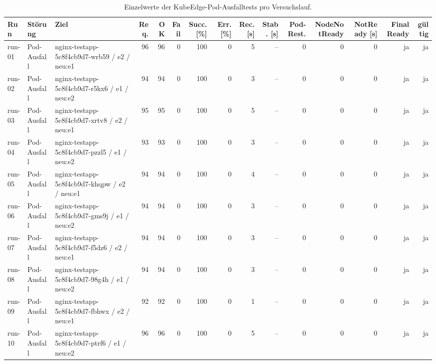 \begin{table}
\centering
\scriptsize
\setlength{\tabcolsep}{3pt}
\renewcommand{\arraystretch}{1.08}
\begin{tabular}{l l p{3.2cm} r r r r r r r r r r r r}
\toprule
Run & Störung & Ziel & Req. & OK & Fail & Succ. [\%] & Err. [\%] & Rec. [s] & Stab. [s] & Pod-Rest. & NodeNotReady & NotReady [s] & Final Ready & gültig \\
\midrule
run-01 & Pod-Ausfall & nginx-testapp-5c8f4cb9d7-wrb59 / e2 / neu:e1 & 96 & 96 & 0 & 100 & 0 & 5 & -- & 0 & 0 & 0 & ja & ja \\
run-02 & Pod-Ausfall & nginx-testapp-5c8f4cb9d7-r5kx6 / e1 / neu:e2 & 94 & 94 & 0 & 100 & 0 & 3 & -- & 0 & 0 & 0 & ja & ja \\
run-03 & Pod-Ausfall & nginx-testapp-5c8f4cb9d7-xrtv8 / e2 / neu:e1 & 95 & 95 & 0 & 100 & 0 & 5 & -- & 0 & 0 & 0 & ja & ja \\
run-04 & Pod-Ausfall & nginx-testapp-5c8f4cb9d7-pzzl5 / e1 / neu:e2 & 93 & 93 & 0 & 100 & 0 & 3 & -- & 0 & 0 & 0 & ja & ja \\
run-05 & Pod-Ausfall & nginx-testapp-5c8f4cb9d7-khqpw / e2 / neu:e1 & 94 & 94 & 0 & 100 & 0 & 4 & -- & 0 & 0 & 0 & ja & ja \\
run-06 & Pod-Ausfall & nginx-testapp-5c8f4cb9d7-gms9j / e1 / neu:e2 & 94 & 94 & 0 & 100 & 0 & 3 & -- & 0 & 0 & 0 & ja & ja \\
run-07 & Pod-Ausfall & nginx-testapp-5c8f4cb9d7-f5dz6 / e2 / neu:e1 & 94 & 94 & 0 & 100 & 0 & 3 & -- & 0 & 0 & 0 & ja & ja \\
run-08 & Pod-Ausfall & nginx-testapp-5c8f4cb9d7-98g4h / e1 / neu:e2 & 94 & 94 & 0 & 100 & 0 & 3 & -- & 0 & 0 & 0 & ja & ja \\
run-09 & Pod-Ausfall & nginx-testapp-5c8f4cb9d7-fbhwx / e2 / neu:e1 & 92 & 92 & 0 & 100 & 0 & 1 & -- & 0 & 0 & 0 & ja & ja \\
run-10 & Pod-Ausfall & nginx-testapp-5c8f4cb9d7-ptrf6 / e1 / neu:e2 & 96 & 96 & 0 & 100 & 0 & 5 & -- & 0 & 0 & 0 & ja & ja \\
\bottomrule
\end{tabular}
\caption{Einzelwerte der KubeEdge-Pod-Ausfalltests pro Versuchslauf.}
\label{tab:appendix-kubeedge-pod-failure-runs}
\end{table}

